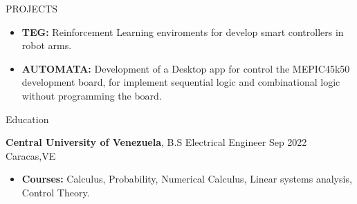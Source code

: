 \documentclass{resume} %
\begin{document}

\begin{rSection}{PROJECTS} 

    \begin{itemize}
        \item \textbf{TEG:} Reinforcement Learning enviroments for develop 
        smart controllers in robot arms. 

        \item \textbf{AUTOMATA:} Development of a Desktop app for control the 
        MEPIC45k50 development board, for implement sequential logic and 
        combinational logic without programming the board.

    \end{itemize}
\end{rSection}


\begin{rSection}{Education} %

    \textbf{Central University of Venezuela}, B.S Electrical Engineer 
    \hfill {Sep 2022} \\ \hfill{Caracas,VE}

    \begin{itemize}
        \item \textbf{Courses:} Calculus, Probability, Numerical Calculus, 
        Linear systems analysis, Control Theory.

    \end{itemize}

\end{rSection}
\end{document}
